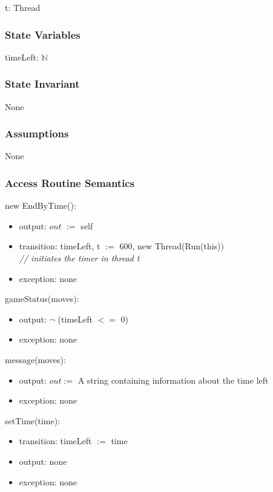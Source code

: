 \documentclass[12pt]{article}
\begin{document}
t: Thread

\subsubsection*{State Variables}

timeLeft: $\mathbb{N}$ \\

\subsubsection*{State Invariant}

None

\subsubsection*{Assumptions}

None

\subsubsection* {Access Routine Semantics}

new EndByTime():

\begin{itemize}
  \item output: $out$ $:=$ self
  \item transition: timeLeft, t $:=$ 600, new Thread(Run(this)) \\ \textit{// initiates the timer in thread t}
  \item exception: none
\end{itemize}

\noindent gameStatus(moves):

\begin{itemize}
  \item output: $\lnot$ (timeLeft $<=$ 0)
  \item exception: none
\end{itemize}

\noindent message(moves):
\begin{itemize}
  \item output: $out :=$ A string containing information about the time left
  \item exception: none
\end{itemize}

\noindent setTime(time):
\begin{itemize}
  \item transition: timeLeft $:=$ time
  \item output: none
  \item exception: none
\end{itemize}
\end{document}
